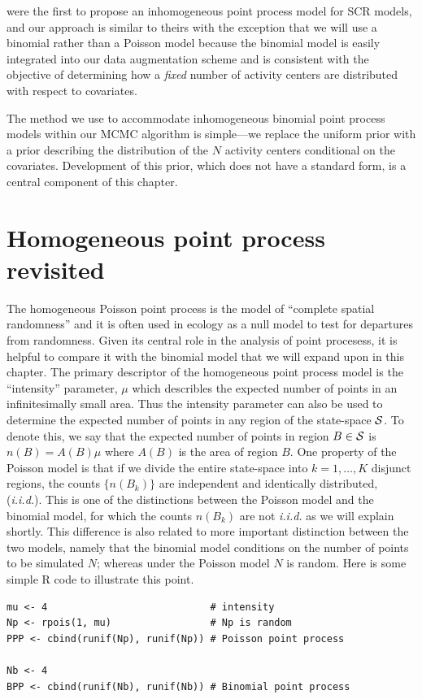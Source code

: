 \citet{borchers_efford:2008} were the first to propose an
inhomogeneous point process model for SCR models, and our approach is
similar to theirs with the exception that we will use a binomial
rather than a Poisson model because the binomial model is
easily integrated into our data augmentation scheme and is consistent
with the objective of determining how a {\it fixed} number of activity
centers are distributed with respect to covariates.

The method we use to accommodate inhomogeneous binomial point process
models within our MCMC algorithm is simple---we
replace the uniform prior with a prior describing the
distribution of
the $N$ activity centers conditional on the covariates. Development of
this prior, which does not have a
standard form, is a central component of this chapter.


\section{Homogeneous point process revisited}

The homogeneous Poisson point process is the model of ``complete
spatial randomness'' and it is often used in ecology as a null model
to test for departures from randomness. Given its central role in the
analysis of point procesess, it is helpful to compare it with
the binomial model that we will expand upon in this chapter. The
primary descriptor of the homogeneous point process model is the
``intensity'' parameter, $\mu$ which describles the expected number
of points in an infinitesimally small area. Thus the intensity
parameter can also be used to determine the expected number of points
in any region of the state-space $\cal{S}$. To denote this, we say
that the expected number of points in region $B \in \cal{S}$ is
$n(B) = A(B)\mu$ where $A(B)$ is the area of region $B$.  One property
of the Poisson model is that if we divide the entire state-space into
$k=1,\dots,K$ disjunct regions, the counts $\{n(B_k)\}$ are
independent and identically distributed, ({\it i.i.d.}). This is one
of the distinctions between the Poisson model and the binomial model,
for which the counts $n(B_k)$ are not {\it i.i.d.} as we will explain
shortly. This difference is also related to more important distinction
between the two models, namely that the binomial model
conditions on the number of points to be simulated $N$; whereas under
the Poisson model $N$ is random. Here is some simple R code to
illustrate this point.

\begin{verbatim}
mu <- 4                            # intensity
Np <- rpois(1, mu)                 # Np is random
PPP <- cbind(runif(Np), runif(Np)) # Poisson point process

Nb <- 4
BPP <- cbind(runif(Nb), runif(Nb)) # Binomial point process
\end{verbatim}

